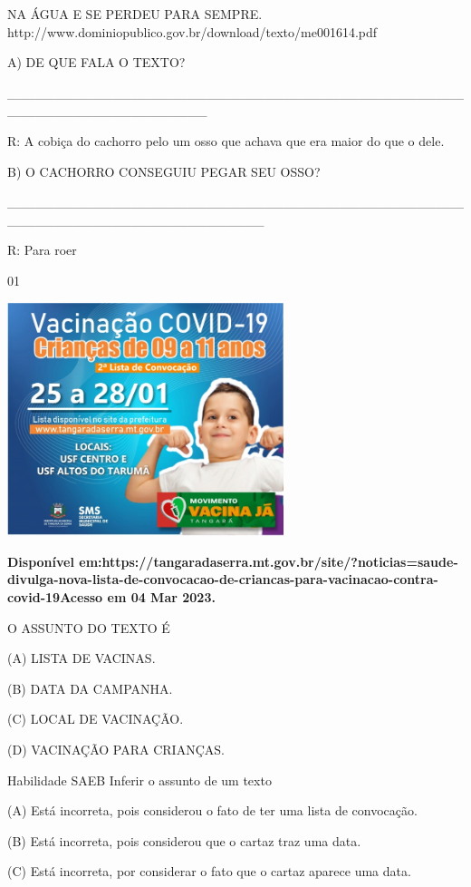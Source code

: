 {{NA ÁGUA E SE PERDEU PARA SEMPRE.
http://www.dominiopublico.gov.br/download/texto/me001614.pdf

A) DE QUE FALA O TEXTO?

\_\_\_\_\_\_\_\_\_\_\_\_\_\_\_\_\_\_\_\_\_\_\_\_\_\_\_\_\_\_\_\_\_\_\_\_\_\_\_\_\_\_\_\_\_\_\_\_\_\_\_\_\_\_\_\_\_\_\_\_\_\_\_\_\_\_\_\_\_

R: A cobiça do cachorro pelo um osso que achava que era maior do que o
dele.

B) O CACHORRO CONSEGUIU PEGAR SEU OSSO?

\_\_\_\_\_\_\_\_\_\_\_\_\_\_\_\_\_\_\_\_\_\_\_\_\_\_\_\_\_\_\_\_\_\_\_\_\_\_\_\_\_\_\_\_\_\_\_\_\_\_\_\_\_\_\_\_\_\_\_\_\_\_\_\_\_\_\_\_\_\_\_\_\_\_\_

R: Para roer


\num{01}

\includegraphics[width=3.17910in,height=2.68418in]{media/image124.jpeg}

\textbf{Disponível
em:https://tangaradaserra.mt.gov.br/site/?noticias=saude-divulga-nova-lista-de-convocacao-de-criancas-para-vacinacao-contra-covid-19Acesso
em 04 Mar 2023.}

O ASSUNTO DO TEXTO É

(A) LISTA DE VACINAS.

(B) DATA DA CAMPANHA.

(C) LOCAL DE VACINAÇÃO.

(D) VACINAÇÃO PARA CRIANÇAS.

Habilidade SAEB Inferir o assunto de um texto

(A) Está incorreta, pois considerou o fato de ter uma lista de
convocação.

(B) Está incorreta, pois considerou que o cartaz traz uma data.

(C) Está incorreta, por considerar o fato que o cartaz aparece uma data.

}}
